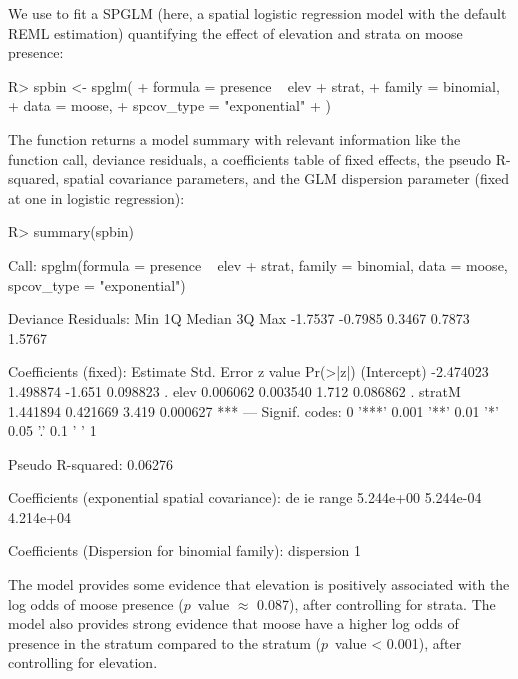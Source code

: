 \documentclass[
]{jss}
\begin{document}
We use  to fit a SPGLM (here, a spatial logistic
regression model with the default REML estimation) quantifying the
effect of elevation and strata on moose presence:

\begin{CodeChunk}
\begin{CodeInput}
R> spbin <- spglm(
+    formula = presence ~ elev + strat,
+    family = binomial,
+    data = moose,
+    spcov_type = "exponential"
+  )
\end{CodeInput}
\end{CodeChunk}

The  function returns a model summary with relevant
information like the function call, deviance residuals, a coefficients
table of fixed effects, the pseudo R-squared, spatial covariance
parameters, and the GLM dispersion parameter (fixed at one in logistic
regression):

\begin{CodeChunk}
\begin{CodeInput}
R> summary(spbin)
\end{CodeInput}
\begin{CodeOutput}

Call:
spglm(formula = presence ~ elev + strat, family = binomial, data = moose, 
    spcov_type = "exponential")

Deviance Residuals:
    Min      1Q  Median      3Q     Max 
-1.7537 -0.7985  0.3467  0.7873  1.5767 

Coefficients (fixed):
             Estimate Std. Error z value Pr(>|z|)    
(Intercept) -2.474023   1.498874  -1.651 0.098823 .  
elev         0.006062   0.003540   1.712 0.086862 .  
stratM       1.441894   0.421669   3.419 0.000627 ***
---
Signif. codes:  0 '***' 0.001 '**' 0.01 '*' 0.05 '.' 0.1 ' ' 1

Pseudo R-squared: 0.06276

Coefficients (exponential spatial covariance):
       de        ie     range 
5.244e+00 5.244e-04 4.214e+04 

Coefficients (Dispersion for binomial family):
dispersion 
         1 
\end{CodeOutput}
\end{CodeChunk}

The model provides some evidence that elevation is positively associated
with the log odds of moose presence (\(p\)~value \(\approx\) 0.087),
after controlling for strata. The model also provides strong evidence
that moose have a higher log odds of presence in the  stratum
compared to the  stratum (\(p\)~value \textless{} 0.001),
after controlling for elevation.
\end{document}
